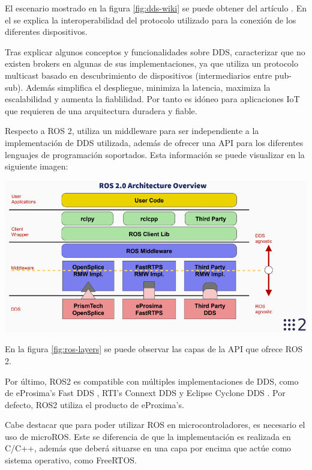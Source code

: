 El escenario mostrado en la figura \ref{fig:dds-wiki} se puede obtener del artículo \cite{dds-omg}. En el se explica la interoperabilidad del protocolo utilizado para la conexión de los diferentes dispositivos.

Tras explicar algunos conceptos y funcionalidades sobre DDS, caracterizar que no existen brokers en algunas de sus implementaciones, ya que utiliza un protocolo multicast basado en descubrimiento de dispositivos (intermediarios entre pub-sub). Además simplifica el despliegue, minimiza la latencia, maximiza la escalabilidad y aumenta la fiablilidad. Por tanto es idóneo para aplicaciones IoT que requieren de una arquitectura duradera y fiable.

Respecto a ROS 2, utiliza un middleware para ser independiente a la implementación de DDS utilizada, además de ofrecer una API para los diferentes lenguajes de programación soportados. Esta información se puede visualizar en la siguiente imagen:


\begin{center}
    \centering
    \includegraphics[width=\textwidth]{img/03-ROS2-Middleware.png}
    \label{fig:ros-layers}
\end{center}

En la figura \ref{fig:ros-layers} se puede observar las capas de la API que ofrece ROS 2.

Por último, ROS2 es compatible con múltiples implementaciones de DDS, como de eProsima's Fast DDS \cite{fastdds}, RTI's Connext DDS \cite{connextdds} y Eclipse Cyclone DDS \cite{cyclonedds}. Por defecto, ROS2 utiliza el producto de eProxima's.

Cabe destacar que para poder utilizar ROS en microcontroladores, es necesario el uso de microROS. Este se diferencia de que la implementación es realizada en C/C++, además que deberá situarse en una capa por encima que actúe como sistema operativo, como \ac{FreeRTOS}.

